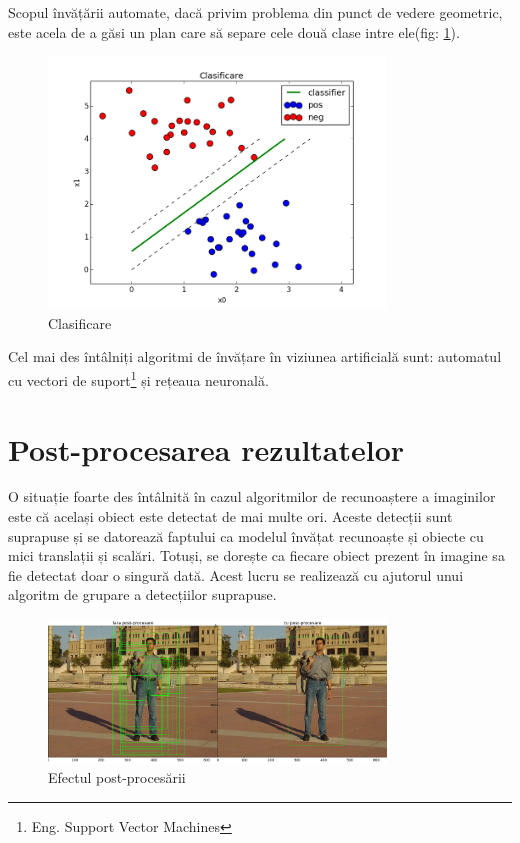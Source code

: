 Scopul învățării automate, dacă privim problema din punct de vedere geometric, este acela de a găsi un plan care să separe cele două clase intre ele(fig: \ref{fig:fig_clasificare}).

\begin{figure}[h]
	\centering
		\includegraphics[width=0.8\textwidth]{imagini/fig_clasificare2.png}
	\caption{Clasificare}
	\label{fig:fig_clasificare}
\end{figure}

Cel mai des întâlniți algoritmi de învățare în viziunea artificială sunt: automatul cu vectori de suport\footnote{Eng. Support Vector Machines}\cite{suykens1999least} și rețeaua neuronală.

\pagebreak
\section{Post-procesarea rezultatelor}

O situație foarte des întâlnită în cazul algoritmilor de recunoaștere a imaginilor este că același obiect este detectat de mai multe ori.
Aceste detecții sunt suprapuse și se datorează faptului ca modelul învățat recunoaște și obiecte cu mici translații și scalări.
Totuși, se dorește ca fiecare obiect prezent în imagine sa fie detectat doar o singură dată.
Acest lucru se realizează cu ajutorul unui algoritm de grupare a detecțiilor suprapuse.
\begin{figure}[h]
	\centering
		\includegraphics[width=0.8\textwidth]{imagini/nms.png}
	\caption{Efectul post-procesării}
	\label{fig:nms}
\end{figure}


